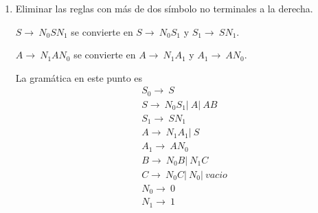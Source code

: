\documentclass{article}
\begin{document}
\begin{enumerate}
\begin{enumerate}
        \item Eliminar las reglas con más de dos símbolo no terminales a la derecha.
        
        $S \rightarrow \ N_0SN_1$ se convierte en $S \rightarrow \ N_0S_1$ y 
        $S_1 \rightarrow \ SN_1$.

        $A \rightarrow \ N_1AN_0$ se convierte en $A \rightarrow \ N_1A_1$ y 
        $A_1 \rightarrow \ AN_0$.

        La gramática en este punto es
        \begin{align*}
            &S_0 \rightarrow \ S \\
            &S \rightarrow \ N_0S_1 |\ A |\ AB \\
            &S_1 \rightarrow \ SN_1 \\
            &A \rightarrow \ N_1A_1 |\ S \\
            &A_1 \rightarrow \ AN_0 \\
            &B \rightarrow \ N_0B |\ N_1C \\
            &C \rightarrow \ N_0C |\ N_0 |\ vacio \\
            &N_0 \rightarrow \ 0 \\
            &N_1 \rightarrow \ 1
        \end{align*}
    \end{enumerate}
\end{enumerate}
\end{document}
